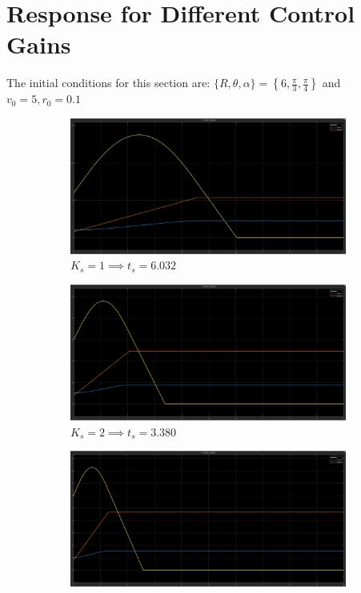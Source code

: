 \documentclass[12pt]{article}
\begin{document}
\section{Response for Different Control Gains}
The initial conditions for this section are: \(\{R, \theta, \alpha\} = \left\{6, \frac{\pi}{3}, \frac{\pi}{4}\right\}\) and \(v_0 = 5, r_0 = 0.1\)
\begin{figure}[h]
    \centering
    \begin{subfigure}{.48\textwidth}
        \centering
        \includegraphics[width=0.9\linewidth]{images/K1.png}
		\caption{\(K_s=1\implies t_s=6.032\)}
    \end{subfigure}
    \begin{subfigure}{.48\textwidth}
        \centering
        \includegraphics[width=0.9\linewidth]{images/K2.png}
		\caption{\(K_s=2\implies t_s=3.380\)}
    \end{subfigure}
	\begin{subfigure}{.48\textwidth}
        \centering
        \includegraphics[width=0.9\linewidth]{images/K3.png}

\end{subfigure}
\end{figure}
\end{document}
